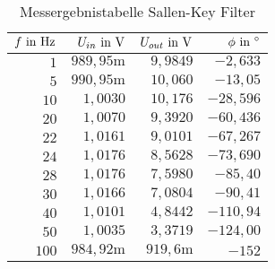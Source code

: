 \begin{table}[H]
\centering
\caption{Messergebnistabelle Sallen-Key Filter}
\label{tab:sallen_key_erg_table}
\begin{tabular}{|r|r|r|r|}
\hline
\rowcolor[HTML]{C0C0C0} 
$f\text{ in }\text{Hz}   $&$ U_{in}\text{ in }\text{V}       $&$ U_{out}\text{ in }\text{V}     $&$ \phi\text{ in }^\circ   $\\ \hline
$1   $&$ 989,95\text{m} $&$ 9,9849   $&$ -2,633  $\\ \hline
$5   $&$ 990,95\text{m} $&$ 10,060   $&$ -13,05  $\\ \hline
$10  $&$ 1,0030    $&$ 10,176   $&$ -28,596 $\\ \hline
$20  $&$ 1,0070    $&$ 9,3920   $&$ -60,436 $\\ \hline
$22  $&$ 1,0161    $&$ 9,0101   $&$ -67,267 $\\ \hline
$24  $&$ 1,0176    $&$ 8,5628   $&$ -73,690 $\\ \hline
$28  $&$ 1,0176    $&$ 7,5980   $&$ -85,40  $\\ \hline
$30  $&$ 1,0166    $&$ 7,0804   $&$ -90,41  $\\ \hline
$40  $&$ 1,0101    $&$ 4,8442   $&$ -110,94 $\\ \hline
$50  $&$ 1,0035    $&$ 3,3719   $&$ -124,00 $\\ \hline
$100 $&$ 984,92\text{m} $&$ 919,6\text{m} $&$ -152    $\\ \hline
\end{tabular}
\end{table}